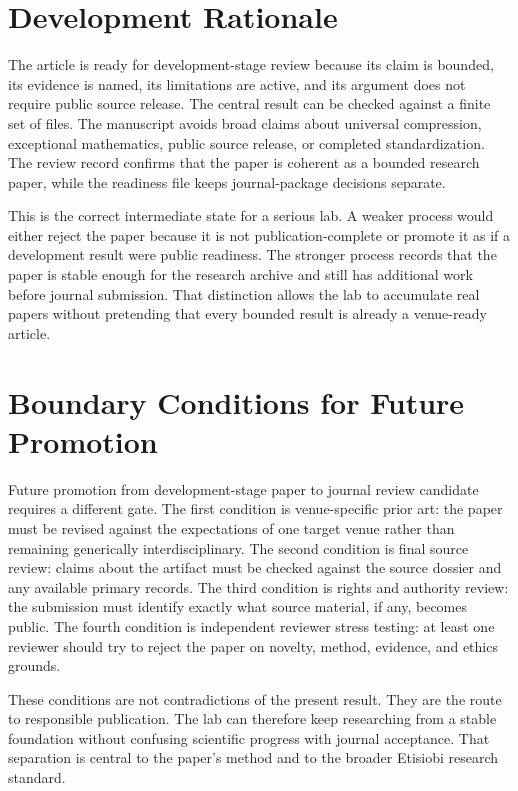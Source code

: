 \documentclass[sigconf,nonacm]{acmart}
\begin{document}
\section{Development Rationale}
The article is ready for development-stage review because its claim is bounded,
its evidence is named, its limitations are active, and its argument does not
require public source release. The central result can be checked against a
finite set of files. The manuscript avoids broad claims about universal
compression, exceptional mathematics, public source release, or completed
standardization. The review record confirms that the paper is coherent as a
bounded research paper, while the readiness file keeps journal-package decisions
separate.

This is the correct intermediate state for a serious lab. A weaker process would
either reject the paper because it is not publication-complete or promote it as
if a development result were public readiness. The stronger process records that
the paper is stable enough for the research archive and still has additional
work before journal submission. That distinction allows the lab to accumulate
real papers without pretending that every bounded result is already a
venue-ready article.

\section{Boundary Conditions for Future Promotion}
Future promotion from development-stage paper to journal review candidate
requires a different gate. The first condition is venue-specific prior art: the
paper must be revised against the expectations of one target venue rather than
remaining generically interdisciplinary. The second condition is final source
review: claims about the artifact must be checked against the source dossier and
any available primary records. The third condition is rights and authority
review: the submission must identify exactly what source material, if any,
becomes public. The fourth condition is independent reviewer stress testing: at
least one reviewer should try to reject the paper on novelty, method, evidence,
and ethics grounds.

These conditions are not contradictions of the present result. They are the
route to responsible publication. The lab can therefore keep researching from a
stable foundation without confusing scientific progress with journal acceptance.
That separation is central to the paper's method and to the broader Etisiobi
research standard.
\end{document}

